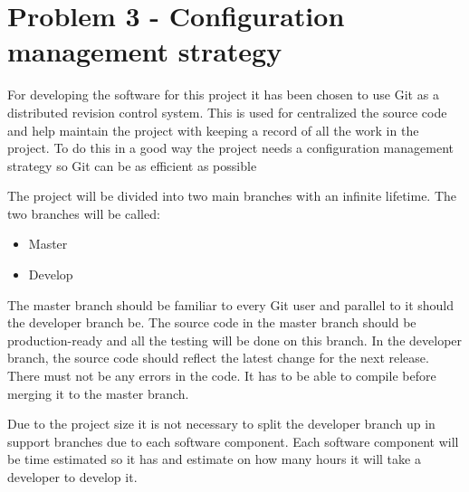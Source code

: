 \chapter{Problem 3 - Configuration management strategy}
For developing the software for this project it has been chosen to use Git as a distributed revision control system.
This is used for centralized the source code and help maintain the project with keeping a record of all the work in the project.
To do this in a good way the project needs a configuration management strategy so Git can be as efficient as possible 

The project will be divided into two main branches with an infinite lifetime. The two branches will be called:
\begin{itemize}  
	\item Master
	\item Develop
\end{itemize}
The master branch should be familiar to every Git user and parallel to it should the developer branch be.
The source code in the master branch should be production-ready and all the testing will be done on this branch. In the developer branch, the source code should reflect the latest change for the next release.
There must not be any errors in the code. It has to be able to compile before merging it to the master branch.

Due to the project size it is not necessary to split the developer branch up in support branches due to each software component.
Each software component will be time estimated so it has and estimate on how many hours it will take a developer to develop it. 